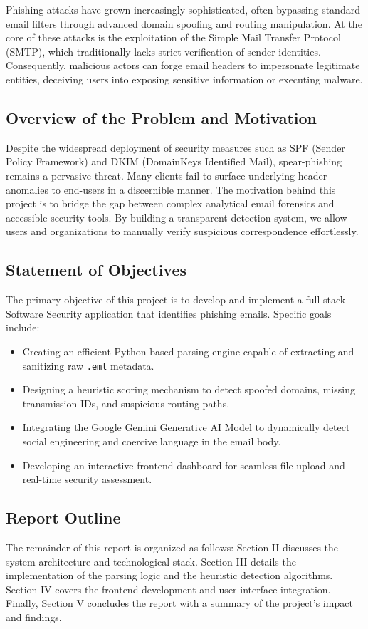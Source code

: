 \documentclass[conference]{IEEEtran}
\begin{document}
Phishing attacks have grown increasingly sophisticated, often bypassing standard email filters through advanced domain spoofing and routing manipulation. At the core of these attacks is the exploitation of the Simple Mail Transfer Protocol (SMTP), which traditionally lacks strict verification of sender identities. Consequently, malicious actors can forge email headers to impersonate legitimate entities, deceiving users into exposing sensitive information or executing malware. 

\subsection{Overview of the Problem and Motivation}
Despite the widespread deployment of security measures such as SPF (Sender Policy Framework) and DKIM (DomainKeys Identified Mail), spear-phishing remains a pervasive threat. Many clients fail to surface underlying header anomalies to end-users in a discernible manner. The motivation behind this project is to bridge the gap between complex analytical email forensics and accessible security tools. By building a transparent detection system, we allow users and organizations to manually verify suspicious correspondence effortlessly.

\subsection{Statement of Objectives}
The primary objective of this project is to develop and implement a full-stack Software Security application that identifies phishing emails. Specific goals include:
\begin{itemize}
    \item Creating an efficient Python-based parsing engine capable of extracting and sanitizing raw \texttt{.eml} metadata.
    \item Designing a heuristic scoring mechanism to detect spoofed domains, missing transmission IDs, and suspicious routing paths.
    \item Integrating the Google Gemini Generative AI Model to dynamically detect social engineering and coercive language in the email body.
    \item Developing an interactive frontend dashboard for seamless file upload and real-time security assessment.
\end{itemize}

\subsection{Report Outline}
The remainder of this report is organized as follows: Section II discusses the system architecture and technological stack. Section III details the implementation of the parsing logic and the heuristic detection algorithms. Section IV covers the frontend development and user interface integration. Finally, Section V concludes the report with a summary of the project's impact and findings.
\end{document}
